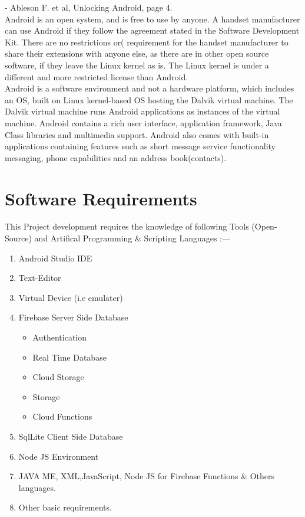 \bigskip
- Ableson F. et al, Unlocking Android, page 4.\\

\noindent
Android is an open system, and is free to use by anyone. A handset manufacturer can use Android if they follow the agreement stated in the Software Development Kit. There are no restrictions or( requirement for the handset manufacturer to share their extensions with anyone else, as there are in other open source software, if they leave the Linux kernel as is. The Linux kernel is under a different and more restricted license than Android.\\

\noindent
Android is a software environment and not a hardware platform, which includes an OS, built on Linux kernel-based OS hosting the Dalvik virtual machine. The Dalvik virtual machine runs Android applications as instances of the virtual machine. Android contains a rich user interface, application framework, Java Class libraries and multimedia support. Android also comes with built-in applications containing features such as short message service functionality messaging, phone capabilities and an address book(contacts).

\section{Software Requirements}
This Project development requires the knowledge of following Tools (Open-Source) and Artifical Programming \& Scripting Languages :—
\bigskip
\begin{enumerate}
	\setlength{\itemsep}{-0.3em}
	\item Android Studio IDE
	\item Text-Editor
	\item Virtual Device (i.e emulater) 
	\item Firebase Server Side Database
		\begin{itemize}
			\item Authentication
			\item Real Time Database
			\item Cloud Storage
			\item Storage
			\item Cloud Functions
		\end{itemize}
	\item SqlLite Client Side Database
	\item Node JS Environment
	\item JAVA ME, XML,JavaScript, Node JS for Firebase Functions \& Others languages.
	\item Other basic requirements. 
\end{enumerate}



